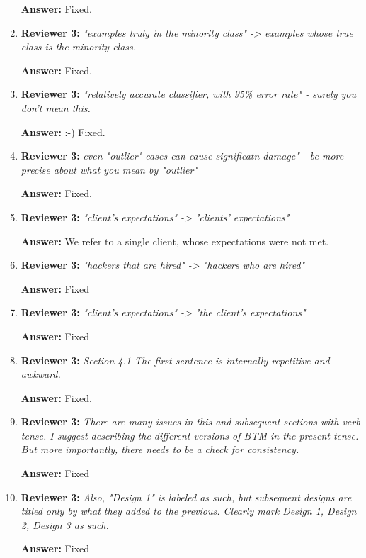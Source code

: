 \documentclass[letterpaper]{article}
\begin{document}
\begin{enumerate}
\textbf{Answer:} Fixed.

\item \textbf{Reviewer 3:} \emph{ "examples truly in the minority class" -> examples whose true class is the minority class.}

\textbf{Answer:} Fixed.

\item \textbf{Reviewer 3:} \emph{ "relatively accurate classifier, with 95\% error rate" - surely you don't mean this.}

\textbf{Answer:} :-) Fixed.

\item \textbf{Reviewer 3:} \emph{ even "outlier" cases can cause significatn damage" - be more precise about what you mean by "outlier"}

\textbf{Answer:} Fixed.

\item \textbf{Reviewer 3:} \emph{"client's expectations" -> "clients' expectations"}

\textbf{Answer:} We refer to a single client, whose expectations were not met.

\item \textbf{Reviewer 3:} \emph{"hackers that are hired" -> "hackers who are hired"}

\textbf{Answer:} Fixed

\item \textbf{Reviewer 3:} \emph{"client's expectations" -> "the client's expectations"}

\textbf{Answer:} Fixed

\item \textbf{Reviewer 3:} \emph{Section 4.1 The first sentence is internally repetitive and awkward.}

\textbf{Answer:} Fixed.

\item \textbf{Reviewer 3:} \emph{ There are many issues in this and subsequent sections with verb tense. I suggest describing the different versions of BTM in the present tense.  But more importantly, there needs to be a check for consistency.}

\textbf{Answer:} Fixed

\item \textbf{Reviewer 3:} \emph{ Also, "Design 1" is labeled as such, but subsequent designs are titled only by what they added to the previous.  Clearly mark Design 1, Design 2, Design 3 as such.}

\textbf{Answer:} Fixed


\end{enumerate}
\end{document}
